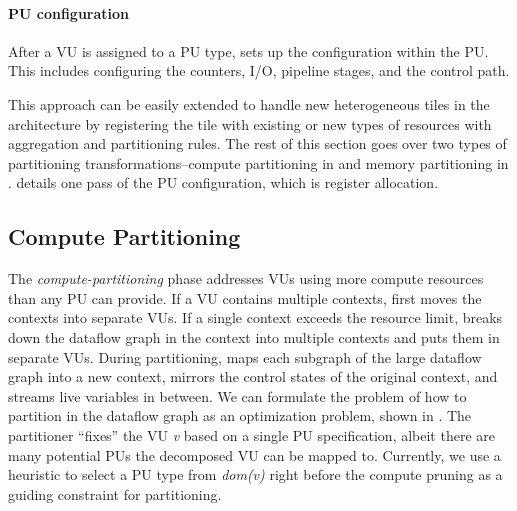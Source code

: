 \paragraph{PU configuration}
After a VU is assigned to a PU type, \name sets up the configuration within the PU.
This includes configuring the counters, I/O, pipeline stages, and the control path.

This approach can be easily extended to handle new heterogeneous tiles in the architecture by registering
the tile with existing or new types of resources with aggregation and partitioning rules.
The rest of this section goes over two types of partitioning transformations--compute
partitioning in  and memory partitioning in .
 details one pass of the PU configuration, which is register allocation.

\subsection{Compute Partitioning} 
\label{sec:compsplit}

The {\em compute-partitioning} phase addresses VUs using more compute resources than any PU can provide. 
If a VU contains multiple contexts, \name{} first moves the contexts into separate VUs.
If a single context exceeds the resource limit, \name breaks down the dataflow graph in the context into multiple contexts and puts them in separate VUs.
During partitioning, \name maps each subgraph of the large dataflow graph into a new context, mirrors the control states of the original context, and streams live variables in between.
We can formulate the problem of how to partition in the dataflow graph as an optimization problem, shown in
.
The partitioner ``fixes'' the VU \emph{v} based on a single PU specification, albeit there are many potential PUs 
the decomposed VU can be mapped to.
Currently, we use a heuristic to select a PU type from \emph{dom(v)} right before the compute pruning 
as a guiding constraint for partitioning.

